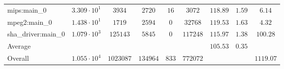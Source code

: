 \begin{tabular}{|l|c|c|c|c|c|c|c|c|}
mips:main\_0            & $ 3.309 \cdot 10^{1} $ & $ 3934    $ & $ 2720   $ & $ 16  $ & $ 3072   $ & $ 118.89      $ & $ 1.59    $ & $ 6.14    $ \\
mpeg2:main\_0           & $ 1.438 \cdot 10^{1} $ & $ 1719    $ & $ 2594   $ & $ 0   $ & $ 32768  $ & $ 119.53      $ & $ 1.63    $ & $ 4.32    $ \\
sha\_driver:main\_0     & $ 1.079 \cdot 10^{3} $ & $ 125143  $ & $ 5845   $ & $ 0   $ & $ 117248 $ & $ 115.97      $ & $ 1.38    $ & $ 100.28  $ \\
\hline
Average                 & $                    $ & $         $ & $        $ & $     $ & $        $ & $ 105.53      $ & $ 0.35    $ & $         $ \\
\hline
Overall                 & $ 1.055 \cdot 10^{4} $ & $ 1023087 $ & $ 134964 $ & $ 833 $ & $ 772072 $ & $             $ & $         $ & $ 1119.07 $ \\
\hline
\end{tabular}
